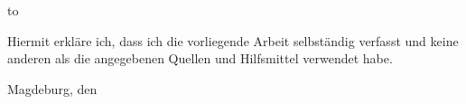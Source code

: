 \thispagestyle{empty}
\vspace*{38\baselineskip}
\hbox to \textwidth{\hrulefill}
\par
Hiermit erkl\"are ich, dass ich die vorliegende Arbeit selbst\"andig verfasst und
keine anderen als die angegebenen Quellen und Hilfsmittel verwendet habe.

Magdeburg, den \todots

\clearpage
